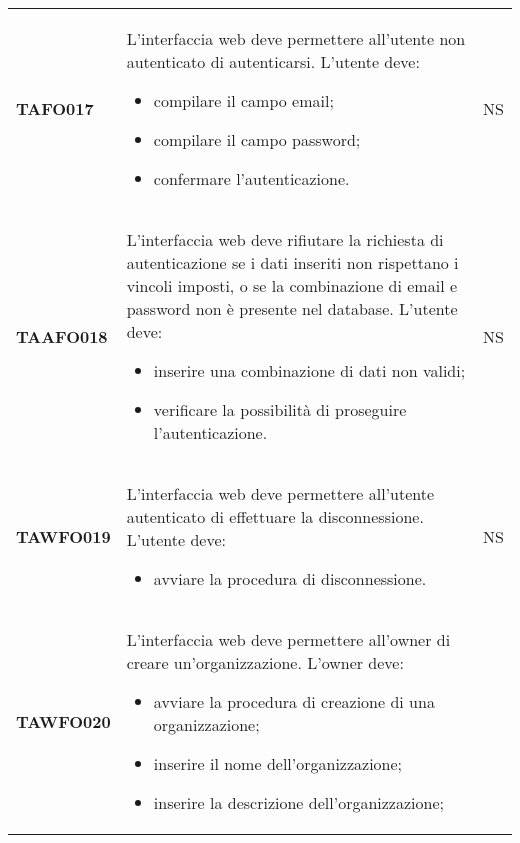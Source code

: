 \documentclass[../piano-di-qualifica.tex]{subfiles}
\begin{document}
\begin{centering}
\begin{longtable}[H]{>{\centering\bfseries}m{3cm} >{}p{10cm} >{\centering\arraybackslash}m{3cm}}
        TAFO017      & L'interfaccia web deve permettere all'utente non autenticato di autenticarsi. \newline
                      L'utente deve:
                      \begin{itemize}
                        \item compilare il campo email;
                        \item compilare il campo password;
                        \item confermare l'autenticazione.
                      \end{itemize}
                      & NS \\
        TAAFO018      & L'interfaccia web deve rifiutare la richiesta di autenticazione se i dati inseriti non rispettano i vincoli imposti, o se la combinazione di email e password non è presente nel database. \newline
                      L'utente deve:
                      \begin{itemize}
                        \item inserire una combinazione di dati non validi;
                        \item verificare la possibilità di proseguire l'autenticazione.
                      \end{itemize}
                      & NS \\
        TAWFO019      & L'interfaccia web deve permettere all'utente autenticato di effettuare la disconnessione. \newline
                      L'utente deve:
                      \begin{itemize}
                      \item avviare la procedura di disconnessione.
                      \end{itemize}
                      & NS \\
        TAWFO020      & L'interfaccia web deve permettere all'owner di creare un'organizzazione. \newline
                      L'owner deve:
                      \begin{itemize}
                      \item avviare la procedura di creazione di una organizzazione;
                      \item inserire il nome dell'organizzazione;
                      \item inserire la descrizione dell'organizzazione;

\end{itemize}
\end{longtable}
\end{centering}
\end{document}
